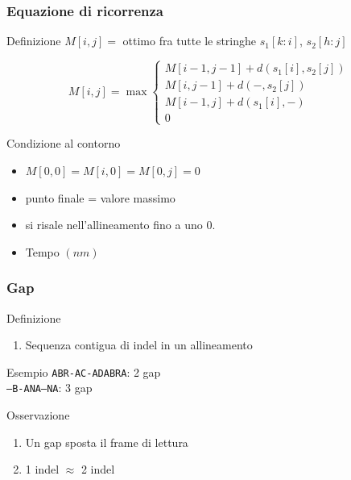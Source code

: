 \begin{frame}[fragile]
\frametitle{Equazione di ricorrenza}
\begin{block}{Definizione}
$M[i,j] = $ ottimo fra tutte le stringhe $s_{1}[k:i]$, $s_{2}[h:j]$
\end{block}
\begin{equation*}
M[i,j] = \max \left\{
\begin{array}{r}%
M[i-1, j-1] + d(s_{1}[i], s_{2}[j])\\
M[i  , j-1] + d( -     , s_{2}[j])\\
M[i-1, j  ] + d(s_{1}[i], -      )\\
0
\end{array}
\right.
\end{equation*}
\begin{block}{Condizione al contorno}
\begin{itemize}
\item
$M[0,0] = M[i,0] = M[0,j] =0$
\item
punto finale = valore massimo
\item
si risale nell'allineamento fino a uno $0$.
\item
Tempo $(nm)$
\end{itemize}
\end{block}
\end{frame}



\begin{frame}[fragile]
\frametitle{Gap}
\begin{block}{Definizione}
\begin{enumerate}
\item
Sequenza contigua di indel in un \alert{allineamento}
\end{enumerate}
\end{block}
\begin{block}{Esempio}
\texttt{ABR\alert{-}AC\alert{-}ADABRA}: 2 gap\\
\texttt{\alert{---}B\alert{-}ANA\alert{---}NA}: 3 gap
\end{block}
\begin{block}{Osservazione}
\begin{enumerate}
\item
Un gap sposta il frame di lettura
\item
1 indel $\approx$ 2 indel
\end{enumerate}
\end{block}
\end{frame}

